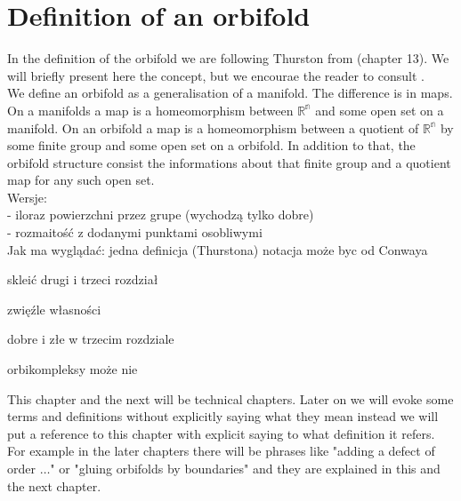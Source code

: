 \chapter{Definition of an orbifold}

In the definition of the orbifold we are following Thurston from \cite{Thurston1979} (chapter 13). 
We will briefly present here the concept, but we encourae the reader to consult 
\cite{Thurston1979}. \\
We define an orbifold as a generalisation of a manifold. The difference is in maps. \\
On a manifolds a map is a homeomorphism between $\mathbb{R^n}$ and some open set on a manifold. 
On an orbifold a map is a homeomorphism between a quotient of $\mathbb{R^n}$ by some 
finite group and some open set on a orbifold.
In addition to that, the orbifold structure consist the informations about that finite group 
and a quotient map for any such open set. \\ 



Wersje: \\
- iloraz powierzchni przez grupe (wychodzą tylko dobre) \\
- rozmaitość z dodanymi punktami osobliwymi \\

Jak ma wyglądać:
jedna definicja (Thurstona)
notacja może byc od Conwaya

skleić drugi i trzeci rozdział

zwięźle własności


dobre i złe w trzecim rozdziale 

orbikompleksy może nie


This chapter and the next will be technical chapters. Later on we will evoke some terms and 
definitions without 
explicitly saying what they mean instead we will put a reference to this chapter with explicit 
saying to what definition it refers. \\
For example in the later chapters there will be phrases like "adding a defect of order $\dots$" or 
"gluing orbifolds by boundaries" and they are explained in this and the next chapter.
 

